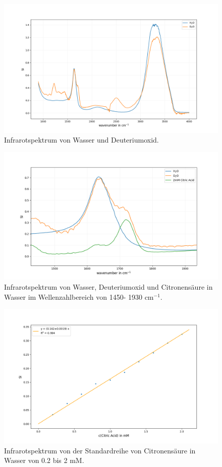 \documentclass[10pt,a4paper]{article}
\begin{document}
		\begin{figure}[H]
			\centering
			\includegraphics[scale=0.55]{Onlywater.png}
			\caption{Infrarotspektrum von Wasser und Deuteriumoxid.}
			\label{fig:water}
		\end{figure}
	
		\begin{figure}[H]
			\centering
			\includegraphics[scale=0.60]{water_citricacid_upclose.png}
			\caption{Infrarotspektrum von Wasser, Deuteriumoxid und Citronensäure in Wasser im Wellenzahlbereich von 1450- 1930 cm$^{-1}$.}
			\label{fig:water_citricacid}
		\end{figure}
		
		\begin{figure}[H]
			\centering
			\includegraphics[scale=0.60]{Standardcurve_Fit.png}
			\caption{Infrarotspektrum von der Standardreihe von Citronensäure in Wasser von 0.2 bis 2 mM. }
			\label{fig:Standardcurve}
		\end{figure}
		
\end{document}
